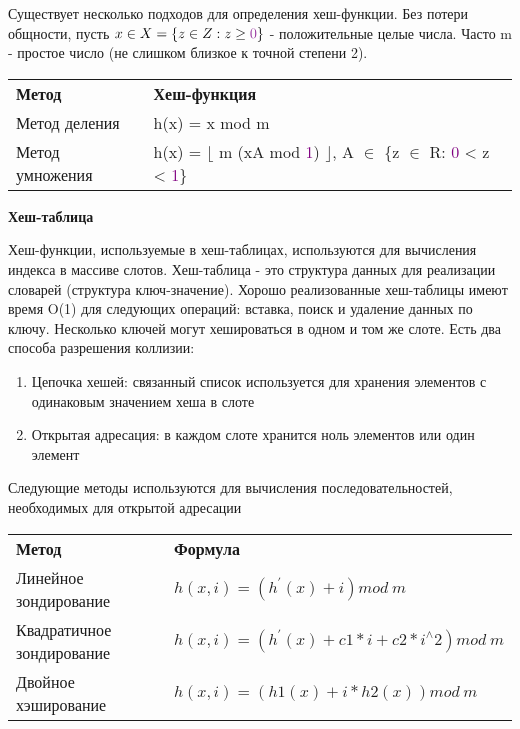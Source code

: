 \vspace{\baselineskip}

Существует несколько подходов для определения хеш-функции. Без потери общности, пусть $x \in X = \{z \in Z : z \geq \textcolor{Purple}{0}\}$ - положительные целые числа. Часто { m} - простое число (не слишком близкое к точной степени 2).

\vspace{\baselineskip}

\begin{tabular}{ll}
\hspace{1cm} \textbf{Метод} & \hspace{3cm}\textbf{Хеш-функция} \\
Метод деления & h(x) = x mod m \\
Метод умножения & h(x) = $\lfloor$ m (xA \: mod \: \textcolor{Purple}{1}) $\rfloor$, A $\in$ \{z $\in$ R: \textcolor{Purple}{0} < z < \textcolor{Purple}{1}\}
\end{tabular}

\vspace{\baselineskip}

\textbf{Хеш-таблица}

\vspace{\baselineskip}

Хеш-функции, используемые в хеш-таблицах, используются для вычисления индекса в массиве слотов. Хеш-таблица - это структура данных для реализации словарей (структура ключ-значение). Хорошо реализованные хеш-таблицы имеют время O(1) для следующих операций: вставка, поиск и удаление данных по ключу. Несколько ключей могут хешироваться в одном и том же слоте. Есть два способа разрешения коллизии:

\begin{enumerate}
    \item Цепочка хешей: связанный список используется для хранения элементов с одинаковым значением хеша в слоте
    \item Открытая адресация: в каждом слоте хранится ноль элементов или один элемент
\end{enumerate}

Следующие методы используются для вычисления последовательностей, необходимых для открытой адресации

\vspace{\baselineskip}

\begin{tabular}{ll}
\hspace{2cm}\textbf{Метод} & \hspace{2cm}\textbf{Формула} \\
Линейное зондирование & $h(x, i) = (h^{'}(x) + i) mod \: m$ \\
Квадратичное зондирование & $h(x, i) = (h^{'}(x) + c1*i + c2*i^{ \wedge} 2) mod \: m$ \\
Двойное хэширование & $h(x, i) = (h1(x) + i*h2(x)) mod \: m$
\end{tabular}

